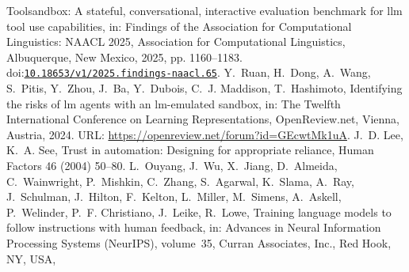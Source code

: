 \documentclass[10pt,a4paper]{article}
\providecommand{\bibinfo}[2]{#2}
\providecommand{\DOIprefix}{doi:}
\providecommand{\URLprefix}{URL: }
\providecommand{\doi}[1]{\href{https://doi.org/#1}{\nolinkurl{#1}}}
\begin{document}
\begin{thebibliography}{25}
\newblock \bibinfo{title}{Toolsandbox: A stateful, conversational, interactive
  evaluation benchmark for llm tool use capabilities},
\newblock in: \bibinfo{booktitle}{Findings of the Association for Computational
  Linguistics: NAACL 2025}, \bibinfo{publisher}{Association for Computational
  Linguistics}, \bibinfo{address}{Albuquerque, New Mexico},
  \bibinfo{year}{2025}, pp. \bibinfo{pages}{1160--1183}.
  \DOIprefix\doi{10.18653/v1/2025.findings-naacl.65}.
\bibinfo{author}{Y.~Ruan}, \bibinfo{author}{H.~Dong},
  \bibinfo{author}{A.~Wang}, \bibinfo{author}{S.~Pitis},
  \bibinfo{author}{Y.~Zhou}, \bibinfo{author}{J.~Ba},
  \bibinfo{author}{Y.~Dubois}, \bibinfo{author}{C.~J. Maddison},
  \bibinfo{author}{T.~Hashimoto},
\newblock \bibinfo{title}{Identifying the risks of lm agents with an
  lm-emulated sandbox},
\newblock in: \bibinfo{booktitle}{The Twelfth International Conference on
  Learning Representations}, \bibinfo{publisher}{OpenReview.net},
  \bibinfo{address}{Vienna, Austria}, \bibinfo{year}{2024}. \URLprefix
  \url{https://openreview.net/forum?id=GEcwtMk1uA}.
\bibinfo{author}{J.~D. Lee}, \bibinfo{author}{K.~A. See},
\newblock \bibinfo{title}{Trust in automation: Designing for appropriate
  reliance},
\newblock \bibinfo{journal}{Human Factors} \bibinfo{volume}{46}
  (\bibinfo{year}{2004}) \bibinfo{pages}{50--80}.
\bibinfo{author}{L.~Ouyang}, \bibinfo{author}{J.~Wu},
  \bibinfo{author}{X.~Jiang}, \bibinfo{author}{D.~Almeida},
  \bibinfo{author}{C.~Wainwright}, \bibinfo{author}{P.~Mishkin},
  \bibinfo{author}{C.~Zhang}, \bibinfo{author}{S.~Agarwal},
  \bibinfo{author}{K.~Slama}, \bibinfo{author}{A.~Ray},
  \bibinfo{author}{J.~Schulman}, \bibinfo{author}{J.~Hilton},
  \bibinfo{author}{F.~Kelton}, \bibinfo{author}{L.~Miller},
  \bibinfo{author}{M.~Simens}, \bibinfo{author}{A.~Askell},
  \bibinfo{author}{P.~Welinder}, \bibinfo{author}{P.~F. Christiano},
  \bibinfo{author}{J.~Leike}, \bibinfo{author}{R.~Lowe},
\newblock \bibinfo{title}{Training language models to follow instructions with
  human feedback},
\newblock in: \bibinfo{booktitle}{Advances in Neural Information Processing
  Systems (NeurIPS)}, volume~\bibinfo{volume}{35}, \bibinfo{publisher}{Curran
  Associates, Inc.}, \bibinfo{address}{Red Hook, NY, USA},

\end{thebibliography}
\end{document}
